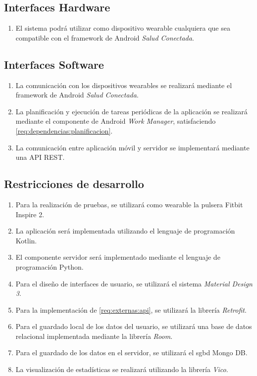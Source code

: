     \subsection{Interfaces Hardware}
        \label{req:externas:hardware}

        \begin{enumerate}[label=\textbf{\texttt{RIS-\arabic*}}]
            \item El sistema podrá utilizar como dispositivo \gls{wearable} cualquiera que sea compatible con el \gls{framework} de Android \textit{Salud Conectada}.
        \end{enumerate}
    
    \subsection{Interfaces Software}
        \label{req:externas:software}
        \begin{enumerate}[label=\textbf{\texttt{RIS-\arabic*}}]
            \item La comunicación con los dispositivos \glspl{wearable} se realizará mediante el \gls{framework} de Android \textit{Salud Conectada}.
            \item La planificación y ejecución de tareas periódicas de la aplicación se realizará mediante el componente de Android \textit{Work Manager}, satisfaciendo \ref{req:dependencias:planificacion}.
            \item \label{req:externas:api} La comunicación entre aplicación móvil y servidor se implementará mediante una API REST.
        \end{enumerate}
    \subsection{Restricciones de desarrollo}
        \label{req:externas:restricciones}
        \begin{enumerate}[label=\textbf{\texttt{RD-\arabic*}}]
            \item Para la realización de pruebas, se utilizará como \gls{wearable} la pulsera Fitbit Inspire 2.
            \item La aplicación será implementada utilizando el lenguaje de programación Kotlin.
            \item El componente servidor será implementado mediante el lenguaje de programación Python.
            \item Para el diseño de interfaces de usuario, se utilizará el sistema \textit{Material Design 3}.
            \item Para la implementación de \ref{req:externas:api}, se utilizará la librería \textit{Retrofit}.
            \item Para el guardado local de los datos del usuario, se utilizará una base de datos relacional implementada mediante la librería \textit{Room}.
            \item Para el guardado de los datos en el servidor, se utilizará el \gls{sgbd} Mongo DB.
            \item La visualización de estadísticas se realizará utilizando la librería \textit{Vico}.
        \end{enumerate}
        